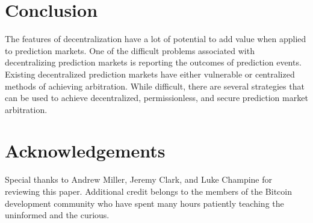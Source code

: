 \documentclass[onecolumn]{article}
\begin{document}
\section{Conclusion}
The features of decentralization have a lot of potential to add value when applied to prediction markets.
One of the difficult problems associated with decentralizing prediction markets is reporting the outcomes of prediction events.
Existing decentralized prediction markets have either vulnerable or centralized methods of achieving arbitration.
While difficult, there are several strategies that can be used to achieve decentralized, permissionless, and secure prediction market arbitration.

\section{Acknowledgements}
Special thanks to Andrew Miller, Jeremy Clark, and Luke Champine for reviewing this paper.
Additional credit belongs to the members of the Bitcoin development community who have spent many hours patiently teaching the uninformed and the curious.
\end{document}
